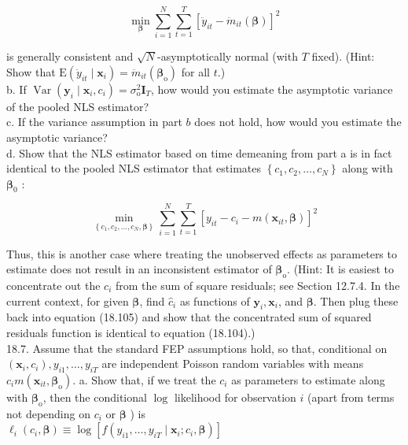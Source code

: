 \documentclass[10pt]{article}
\begin{document}
\begin{equation*}
\min _{\boldsymbol{\beta}} \sum_{i=1}^{N} \sum_{t=1}^{T}\left[\ddot{y}_{i t}-\ddot{m}_{i t}(\boldsymbol{\beta})\right]^{2} \tag{18.104}
\end{equation*}


is generally consistent and $\sqrt{N}$-asymptotically normal (with $T$ fixed). (Hint: Show that $\mathrm{E}\left(\ddot{y}_{i t} \mid \mathbf{x}_{i}\right)=\ddot{m}_{i t}\left(\boldsymbol{\beta}_{\mathrm{o}}\right)$ for all $t$.)\\
b. If $\operatorname{Var}\left(\mathbf{y}_{i} \mid \mathbf{x}_{i}, c_{i}\right)=\sigma_{\mathrm{o}}^{2} \mathbf{I}_{T}$, how would you estimate the asymptotic variance of the pooled NLS estimator?\\
c. If the variance assumption in part $b$ does not hold, how would you estimate the asymptotic variance?\\
d. Show that the NLS estimator based on time demeaning from part a is in fact identical to the pooled NLS estimator that estimates $\left\{c_{1}, c_{2}, \ldots, c_{N}\right\}$ along with $\boldsymbol{\beta}_{0}$ :


\begin{equation*}
\min _{\left\{c_{1}, c_{2}, \ldots, c_{N}, \boldsymbol{\beta}\right\}} \sum_{i=1}^{N} \sum_{t=1}^{T}\left[y_{i t}-c_{i}-m\left(\mathbf{x}_{i t}, \boldsymbol{\beta}\right)\right]^{2} \tag{18.105}
\end{equation*}


Thus, this is another case where treating the unobserved effects as parameters to estimate does not result in an inconsistent estimator of $\boldsymbol{\beta}_{\mathrm{o}}$. (Hint: It is easiest to concentrate out the $c_{i}$ from the sum of square residuals; see Section 12.7.4. In the current context, for given $\boldsymbol{\beta}$, find $\hat{c}_{i}$ as functions of $\mathbf{y}_{i}, \mathbf{x}_{i}$, and $\boldsymbol{\beta}$. Then plug these back into equation (18.105) and show that the concentrated sum of squared residuals function is identical to equation (18.104).)\\
18.7. Assume that the standard FEP assumptions hold, so that, conditional on $\left(\mathbf{x}_{i}, c_{i}\right), y_{i 1}, \ldots, y_{i T}$ are independent Poisson random variables with means $c_{i} m\left(\mathbf{x}_{i t}, \boldsymbol{\beta}_{\mathrm{o}}\right)$. a. Show that, if we treat the $c_{i}$ as parameters to estimate along with $\boldsymbol{\beta}_{\mathrm{o}}$, then the conditional $\log$ likelihood for observation $i$ (apart from terms not depending on $c_{i}$ or $\boldsymbol{\beta}$ ) is\\
$\ell_{i}\left(c_{i}, \boldsymbol{\beta}\right) \equiv \log \left[f\left(y_{i 1}, \ldots, y_{i T} \mid \mathbf{x}_{i} ; c_{i}, \boldsymbol{\beta}\right)\right]$
\end{document}
